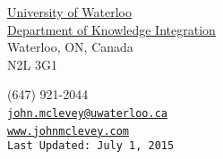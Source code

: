\documentclass[9pt,usenames,dvipsnames]{article}
\date{}
\makeatletter
\def\myemail{john.mclevey@uwaterloo.ca}
\def\myweb{www.johnmclevey.com}
\def\myphone{(647) 921-2044}
\def\lastupdated{Last Updated: July 1, 2015}
\makeatother
\begin{document}
\setsansfont[Mapping=tex-text]{Minion Pro}
\setmonofont[Mapping=tex-text,Scale=0.9]{Inconsolata} 
\newfontfamily{}



\newcommand{\marginhead}[1]{\marginpar{\textsf{{\footnotesize\vspace{-1em}\flushright #1}}}}

\newcommand{\amper}{{\fontspec[Scale=.95,Colour=AA0000]{Minion Pro Medium}\selectfont\&\,}}

\renewcommand{\labelitemi}{~} 

\def\ind{\hangindent=1 true cm\hangafter=1 \noindent}
\def\labelitemi{~}
\renewcommand{\labelitemii}{~}

\pagestyle{fancy}
\renewcommand{\headrulewidth}{0pt}
\fancyhead{}
\fancyfoot{}
\rhead{{\scriptsize\thepage}}

\begin{minipage}[t]{2.95in}
 \flushright \footnotesize \href{https://uwaterloo.ca/}{University of Waterloo} \\  \href{https://uwaterloo.ca/knowledge-integration/faculty-mclevey}{Department of Knowledge Integration} \\ Waterloo, ON, Canada \\ N2L 3G1\\
  \end{minipage}
\hfill     
\hfill
\begin{minipage}[t]{1.7in}
  \flushright \footnotesize \myphone\, \faPhone \\
  {\texttt{\href{mailto:\myemail}{\myemail}} \, \faEnvelope} \\
  {\texttt{\href{\myweb}{\myweb}} \, \faGlobe} \\
  {\texttt{\lastupdated}}\\
\end{minipage}
\end{document}
